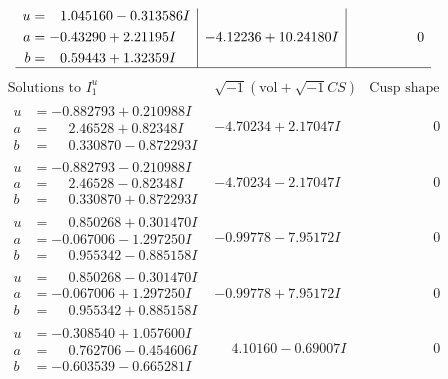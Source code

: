 \documentclass[1p]{elsarticle_modified}
\theoremstyle{definition}
\newcommand{\I}{\sqrt{-1}}
\begin{document}
$$\begin{array}{c|c|c}
\begin{aligned}
u &= \phantom{-}1.045160 - 0.313586 I \\
a &= -0.43290 + 2.21195 I \\
b &= \phantom{-}0.59443 + 1.32359 I\end{aligned}
 & -4.12236 + 10.24180 I & \phantom{-0.000000 } 0\\
 \hline 
 \end{array}$$\newpage$$\begin{array}{c|c|c}  
\text{Solutions to }I^u_{1}& \I (\text{vol} + \sqrt{-1}CS) & \text{Cusp shape}\\
 \hline 
\begin{aligned}
u &= -0.882793 + 0.210988 I \\
a &= \phantom{-}2.46528 + 0.82348 I \\
b &= \phantom{-}0.330870 - 0.872293 I\end{aligned}
 & -4.70234 + 2.17047 I & \phantom{-0.000000 } 0 \\ \hline\begin{aligned}
u &= -0.882793 - 0.210988 I \\
a &= \phantom{-}2.46528 - 0.82348 I \\
b &= \phantom{-}0.330870 + 0.872293 I\end{aligned}
 & -4.70234 - 2.17047 I & \phantom{-0.000000 } 0 \\ \hline\begin{aligned}
u &= \phantom{-}0.850268 + 0.301470 I \\
a &= -0.067006 - 1.297250 I \\
b &= \phantom{-}0.955342 - 0.885158 I\end{aligned}
 & -0.99778 - 7.95172 I & \phantom{-0.000000 } 0 \\ \hline\begin{aligned}
u &= \phantom{-}0.850268 - 0.301470 I \\
a &= -0.067006 + 1.297250 I \\
b &= \phantom{-}0.955342 + 0.885158 I\end{aligned}
 & -0.99778 + 7.95172 I & \phantom{-0.000000 } 0 \\ \hline\begin{aligned}
u &= -0.308540 + 1.057600 I \\
a &= \phantom{-}0.762706 - 0.454606 I \\
b &= -0.603539 - 0.665281 I\end{aligned}
 & \phantom{-}4.10160 - 0.69007 I & \phantom{-0.000000 } 0 \\ \hline\begin{aligned}

\end{aligned}
\end{array}$$
\end{document}
